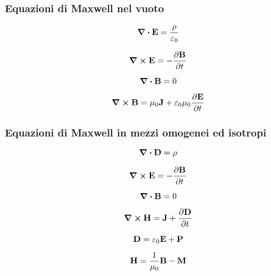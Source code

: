 \subsubsection{Equazioni di Maxwell nel vuoto}
\begin{minipage}[t]{0.5\textwidth}
\[
\div{\vb{E}}=\frac{\rho}{\varepsilon_0}
\]

\[
\curl{\vb{E}}=-\pdv{\vb{B}}{t}
\]

\end{minipage}
\begin{minipage}[t]{0.5\textwidth}
\[
\div{\vb{B}}=0
\]

\[
\curl{\vb{B}}=\mu_0\vb{J}+\varepsilon_0\mu_0\pdv{\vb{E}}{t}
\]

\end{minipage}

\subsubsection{Equazioni di Maxwell in mezzi omogenei ed isotropi}
\begin{minipage}[t]{0.5\textwidth}
\[
\div{\vb{D}}=\rho
\]

\[
\curl{\vb{E}}=-\pdv{\vb{B}}{t}
\]

\end{minipage}
\begin{minipage}[t]{0.5\textwidth}
\[
\div{\vb{B}}=0
\]

\[
\curl{\vb{H}}=\vb{J}+\pdv{\vb{D}}{t}
\]

\end{minipage}

\[
\vb{D}=\varepsilon_0\vb{E}+\vb{P}
\]

\[
\vb{H}=\frac{1}{\mu_0}\vb{B}-\vb{M}
\]

